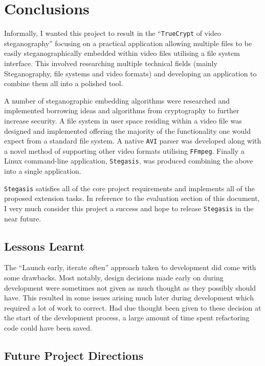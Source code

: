 \documentclass[paper=a4, fontsize=11pt,twoside]{scrartcl}
\numberwithin{table}{section}
\numberwithin{figure}{section}
\numberwithin{algorithm}{section}
\begin{document}
\section{Conclusions}

Informally, I wanted this project to result in the ``\texttt{TrueCrypt} of video steganography'' focusing on a practical application allowing multiple files to be easily steganographically embedded within video files utilising a file system interface. This involved researching multiple technical fields (mainly Steganography, file systems and video formats) and developing an application to combine them all into a polished tool.

A number of steganographic embedding algorithms were researched and implemented borrowing ideas and algorithms from cryptography to further increase security. A file system in user space residing within a video file was designed and implemented offering the majority of the functionality one would expect from a standard file system. A native \texttt{AVI} parser was developed along with a novel method of supporting other video formats utilising \texttt{FFmpeg}. Finally a Linux command-line application, \texttt{Stegasis}, was produced combining the above into a single application.

\texttt{Stegasis} satisfies all of the core project requirements and implements all of the proposed extension tasks. In reference to the evaluation section of this document, I very much consider this project a success and hope to release \texttt{Stegasis} in the near future.

\subsection{Lessons Learnt}

The ``Launch early, iterate often'' approach taken to development did come with some drawbacks. Most notably, design decisions made early on during development were sometimes not given as much thought as they possibly should have. This resulted in some issues arising much later during development which required a lot of work to correct. Had due thought been given to these decision at the start of the development process, a large amount of time spent refactoring code could have been saved. 

\subsection{Future Project Directions}
\end{document}
